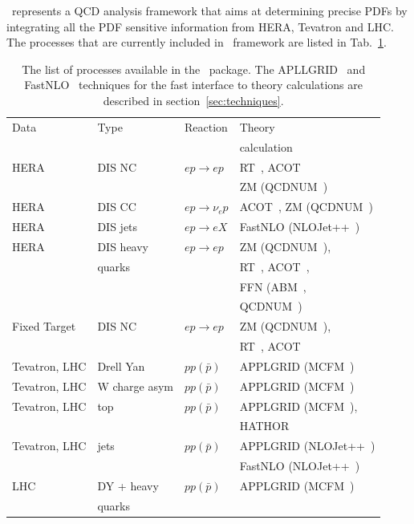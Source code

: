\fitter~represents a QCD analysis framework that aims at 
determining precise PDFs by integrating all the PDF sensitive information
from HERA, Tevatron and LHC.
%
The processes that are currently included in \fitter~framework are listed in Tab.~\ref{tab:proc}.
%
\begin{table}
\small
\scriptsize

\begin{tabular}{|l|l|l|l|}
\hline
Data &Type &  Reaction & Theory      \\
        &     &     & calculation \\
\hline

HERA &DIS NC   &$ep\to ep$      & RT~\cite{Thorne:1997ga,Thorne:2006qt,MSTWpdf,Thorne:6180}, ACOT~\cite{CWZ} \\
     &         &                & ZM (QCDNUM~\cite{qcdnum}) \\
HERA &DIS CC   &$ep\to \nu_e p$ & ACOT~\cite{CWZ}, ZM (QCDNUM~\cite{qcdnum}) \\
HERA &DIS jets &$ep\to eX$      & FastNLO (NLOJet++~\cite{Nagy:1998bb,Nagy:2001fj})\\
HERA &DIS heavy                 & $ep\to ep $& ZM (QCDNUM~\cite{qcdnum}), \\
     & quarks  &                & RT~\cite{Thorne:1997ga,Thorne:2006qt,MSTWpdf,Thorne:6180}, ACOT~\cite{CWZ}, \\
     &         &                & FFN (ABM~\cite{Alekhin:runm,openqcdrad:page}, \\
     &         &                & QCDNUM~\cite{qcdnum}) \\
\hline
Fixed Target   &DIS NC          &$ep\to ep$ & ZM (QCDNUM~\cite{qcdnum}), \\
     &         &                & RT~\cite{Thorne:1997ga,Thorne:2006qt,MSTWpdf,Thorne:6180}, ACOT~\cite{CWZ} \\
\hline
Tevatron, LHC &Drell Yan &$pp(\bar p)$ & APPLGRID (MCFM~\cite{Campbell:1999ah,Campbell:2000je,Campbell:2010ff}) \\
Tevatron, LHC &W charge asym &$pp(\bar p)$ & APPLGRID (MCFM~\cite{Campbell:1999ah,Campbell:2000je,Campbell:2010ff}) \\
Tevatron, LHC &top &$pp(\bar p)$  & APPLGRID (MCFM~\cite{Campbell:1999ah,Campbell:2000je,Campbell:2010ff}),  \\
              &    &              & HATHOR~\cite{Aliev:2010zk} \\
Tevatron, LHC &jets &$pp(\bar p)$ & APPLGRID (NLOJet++~\cite{Nagy:1998bb,Nagy:2001fj}) \\
                &  & & FastNLO (NLOJet++~\cite{Nagy:1998bb,Nagy:2001fj}) \\
LHC& DY + heavy &$pp(\bar p)$ & APPLGRID (MCFM~\cite{Campbell:1999ah,Campbell:2000je,Campbell:2010ff}) \\
   & quarks     &                 & \\
\hline
\end{tabular}
\caption{The list of processes available in the \fitter~package. 
The APLLGRID~\cite{Carli:2010rw} and FastNLO~\cite{Kluge:2006xs,Wobisch:2011ij,Britzger:2012bs} 
techniques for the fast interface to theory calculations are described in section~\ref{sec:techniques}.} 
\label{tab:proc}
\end{table}
